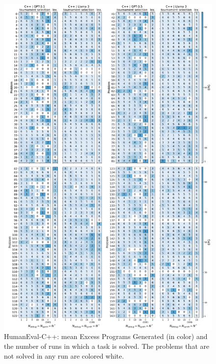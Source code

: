 \begin{figure}[hbt!]
  \centering
  \includegraphics[width=.88\linewidth, trim={0mm 3mm 0mm 2.6mm}, clip]{images/epg_mean_and_num_runs_problem_solved_avg_score_check_w_lexicase_humaneval_C++_6runs_heatmap_v5.pdf}  %
  \vspace{-4pt}
  \caption{HumanEval-C++: mean Excess Programs Generated (in color) and the number of runs in which a task is solved. The problems that are not solved in any run are colored white.}
  \label{fig:epg-num-solved-he-c++}
  \vspace{-12pt}
\end{figure}



